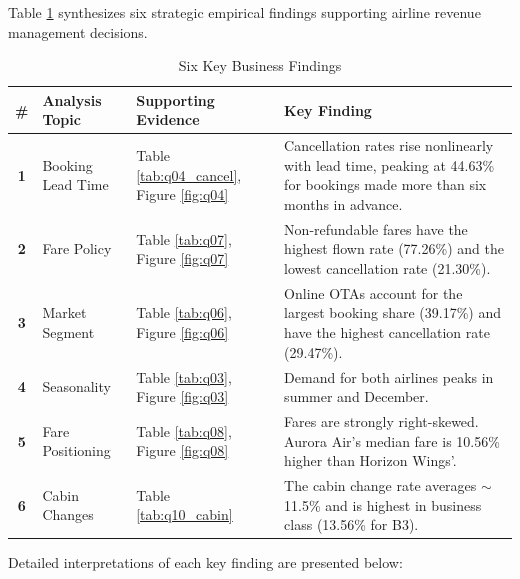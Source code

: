 \documentclass[12pt, a4paper]{report}
\begin{document}
Table \ref{tab:insights_summary} synthesizes six strategic empirical findings supporting airline revenue management decisions.

\begin{table}[H]
  \centering
  \caption{Six Key Business Findings}
  \label{tab:insights_summary}
  \renewcommand{\arraystretch}{1.4}
  \begin{tabularx}{\textwidth}{c XXX}
    \toprule
    \rowcolor{TableHead}
    \textbf{\#} & \textbf{Analysis Topic} & \textbf{Supporting Evidence} & \textbf{Key Finding} \\
    \midrule
    \textbf{1} & Booking Lead Time
      & Table \ref{tab:q04_cancel}, Figure \ref{fig:q04}
      & Cancellation rates rise nonlinearly with lead time, peaking at 44.63\% for bookings made more than six months in advance. \\
    \rowcolor{TableAlt}
    \textbf{2} & Fare Policy
      & Table \ref{tab:q07}, Figure \ref{fig:q07}
      & Non-refundable fares have the highest flown rate (77.26\%) and the lowest cancellation rate (21.30\%). \\
    \textbf{3} & Market Segment
      & Table \ref{tab:q06}, Figure \ref{fig:q06}
      & Online OTAs account for the largest booking share (39.17\%) and have the highest cancellation rate (29.47\%). \\
    \rowcolor{TableAlt}
    \textbf{4} & Seasonality
      & Table \ref{tab:q03}, Figure \ref{fig:q03}
      & Demand for both airlines peaks in summer and December. \\
    \textbf{5} & Fare Positioning
      & Table \ref{tab:q08}, Figure \ref{fig:q08}
      & Fares are strongly right-skewed. Aurora Air's median fare is 10.56\% higher than Horizon Wings'. \\
    \rowcolor{TableAlt}
    \textbf{6} & Cabin Changes
      & Table \ref{tab:q10_cabin}
      & The cabin change rate averages $\sim$11.5\% and is highest in business class (13.56\% for B3). \\
    \bottomrule
  \end{tabularx}
\end{table}

Detailed interpretations of each key finding are presented below:
\end{document}

